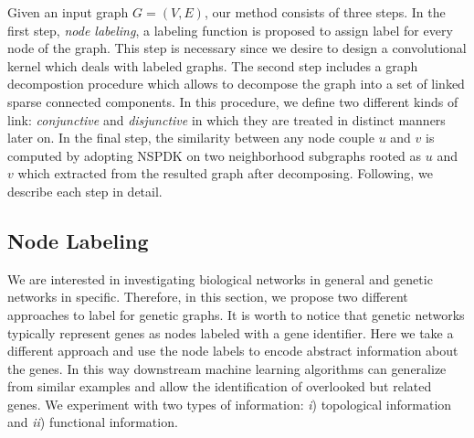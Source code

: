 \documentclass[review]{elsarticle}
\begin{document}
Given an input graph $G=(V,E)$, our method consists of three steps. In the first step, \textit{node labeling}, a labeling function is proposed to assign label for every node of the graph. This step is necessary since we desire to design a convolutional kernel which deals with labeled graphs. The second step includes a graph decompostion procedure which allows to decompose the graph into a set of linked sparse connected components. In this procedure, we define two different kinds of link: \textit{conjunctive} and \textit{disjunctive} in which they are treated in distinct manners later on. In the final step, the similarity between any node couple $u$ and $v$ is computed by adopting NSPDK on two neighborhood subgraphs rooted as $u$ and $v$ which extracted from the resulted graph after decomposing. Following, we describe each step in detail.

\subsection{Node Labeling} 
\label{sec:lab}
We are interested in investigating biological networks in general and genetic networks in specific. Therefore, in this section, we propose two different approaches to label for genetic graphs. It is worth to notice that genetic networks typically represent genes as nodes labeled with a gene identifier. Here we take a different approach and use the node labels to encode abstract information about the genes. In this way downstream machine learning algorithms can generalize from similar examples and allow the identification of overlooked but related genes. We experiment with two types of information: \textit{i}) topological information and \textit{ii}) functional information.\\
\end{document}
